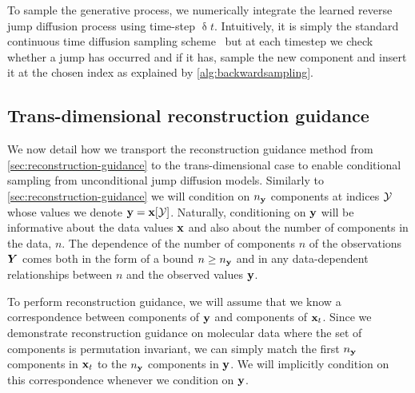 To sample the generative process, we numerically integrate the learned reverse jump diffusion process using time-step  $\updelta t$. Intuitively, it is simply the standard continuous time diffusion sampling scheme~\citep{song2020score} but at each timestep we check whether a jump has occurred and if it has, sample the new component and insert it at the chosen index as explained by \cref{alg:backwardsampling}.

\subsection{Trans-dimensional reconstruction guidance} \label{sec:tddm-reconstruction-guidance}
We now detail how we transport the reconstruction guidance method from \cref{sec:reconstruction-guidance} to the trans-dimensional case to enable conditional sampling from unconditional jump diffusion models. Similarly to \cref{sec:reconstruction-guidance} we will condition on $n_{\mathbf{y}}$ components at indices ${\mathcal{Y}}$ whose values we denote ${\mathbf{y}} = {\mathbf{x}}[{\mathcal{Y}}]$.
Naturally, conditioning on ${\mathbf{y}}$ will be informative about the data values ${\mathbf{x}}$ and also about the number of components in the data, $n$. The dependence of the number of components $n$ of the observations ${\bm{Y}}$ comes both in the form of a bound $n \geq n_{\mathbf{y}}$ and in any data-dependent relationships between $n$ and the observed values ${\mathbf{y}}$.

To perform reconstruction guidance, we will assume that we know a correspondence between components of ${\mathbf{y}}$ and components of ${\mathbf{x}}_t$. Since we demonstrate reconstruction guidance on molecular data where the set of components is permutation invariant, we can simply match the first $n_{\mathbf{y}}$ components in ${\mathbf{x}}_t$ to the $n_{\mathbf{y}}$ components in ${\mathbf{y}}$. We will implicitly condition on this correspondence whenever we condition on ${\mathbf{y}}$.

